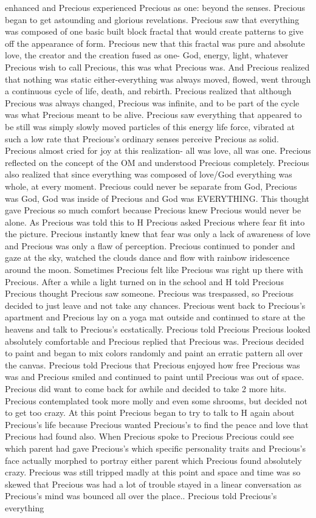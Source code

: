 \documentclass[12pt]{book}
\begin{document}
enhanced and Precious experienced Precious as one: beyond the senses. Precious began to get astounding and glorious revelations. Precious saw that everything was composed of one basic built block fractal that would create patterns to give off the appearance of form. Precious new that this fractal was pure and absolute love, the creator and the creation fused as one- God, energy, light, whatever Precious wish to call Precious, this was what Precious was. And Precious realized that nothing was static either-everything was always moved, flowed, went through a continuous cycle of life, death, and rebirth. Precious realized that although Precious was always changed, Precious was infinite, and to be part of the cycle was what Precious meant to be alive. Precious saw everything that appeared to be still was simply slowly moved particles of this energy life force, vibrated at such a low rate that Precious's ordinary senses perceive Precious as solid. Precious almost cried for joy at this realization- all was love, all was one. Precious reflected on the concept of the OM and understood Precious completely. Precious also realized that since everything was composed of love/God everything was whole, at every moment. Precious could never be separate from God, Precious was God, God was inside of Precious and God was EVERYTHING. This thought gave Precious so much comfort because Precious knew Precious would never be alone. As Precious was told this to H Precious asked Precious where fear fit into the picture. Precious instantly knew that fear was only a lack of awareness of love and Precious was only a flaw of perception. Precious continued to ponder and gaze at the sky, watched the clouds dance and flow with rainbow iridescence around the moon. Sometimes Precious felt like Precious was right up there with Precious. After a while a light turned on in the school and H told Precious Precious thought Precious saw someone. Precious was trespassed, so Precious decided to just leave and not take any chances. Precious went back to Precious's apartment and Precious lay on a yoga mat outside and continued to stare at the heavens and talk to Precious's ecstatically. Precious told Precious Precious looked absolutely comfortable and Precious replied that Precious was. Precious decided to paint and began to mix colors randomly and paint an erratic pattern all over the canvas. Precious told Precious that Precious enjoyed how free Precious was was and Precious smiled and continued to paint until Precious was out of space. Precious did want to come back for awhile and decided to take 2 more hits. Precious contemplated took more molly and even some shrooms, but decided not to get too crazy. At this point Precious began to try to talk to H again about Precious's life because Precious wanted Precious's to find the peace and love that Precious had found also. When Precious spoke to Precious Precious could see which parent had gave Precious's which specific personality traits and Precious's face actually morphed to portray either parent which Precious found absolutely crazy. Precious was still tripped madly at this point and space and time was so skewed that Precious was had a lot of trouble stayed in a linear conversation as Precious's mind was bounced all over the place.. Precious told Precious's everything 
\end{document}
